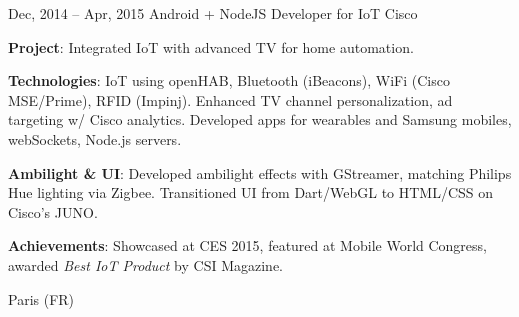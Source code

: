\documentclass[
  a4paper,
   maincolor=cvblue,
   sectioncolor=cvblue,
   sidebarwidth=0.323\paperwidth,
]{fortysecondscv}
\begin{document}
\begin{cvtableNew}
  \cvitemRightNew
    {Dec, 2014 – Apr, 2015} %
    {Android + NodeJS Developer for IoT} %
    {Cisco} %
    {
      \vspace{1pt} %
      \textbf{Project}: Integrated IoT with advanced TV for home automation.\par
      \vspace{4pt}
      \textbf{Technologies}: IoT using openHAB, Bluetooth (iBeacons), WiFi (Cisco MSE/Prime), RFID (Impinj). Enhanced TV channel personalization, ad targeting w/ Cisco analytics. Developed apps for wearables and Samsung mobiles, webSockets, Node.js servers.\par
      \vspace{4pt}
      \textbf{Ambilight \& UI}: Developed ambilight effects with GStreamer, matching Philips Hue lighting via Zigbee. Transitioned UI from Dart/WebGL to HTML/CSS on Cisco’s JUNO.\par
      \vspace{4pt}
      \textbf{Achievements}: Showcased at CES 2015, featured at Mobile World Congress, awarded \textit{Best IoT Product} by CSI Magazine.\par
      \vspace{4pt} %
    }
    {Paris (FR)} %
\end{cvtableNew}
\end{document}
